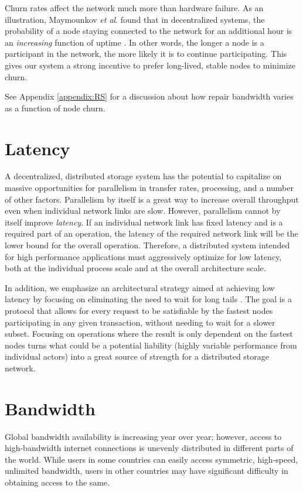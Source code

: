 \documentclass[11pt,fleqn,openany]{book}
\begin{document}
Churn rates affect the network much more than hardware failure. As an
illustration, Maymounkov {\em et al}. found that in
decentralized systems, the probability of a node staying connected to the
network for an additional hour is an {\em increasing}
function of uptime \cite{kad}. In other words, the longer a node is a
participant in the network, the more likely it is to continue
participating. This gives our system a strong incentive to prefer long-lived,
stable nodes to minimize churn.

See Appendix \ref{appendix:RS} for a discussion about how repair bandwidth
varies as a function of node churn.

\section{Latency}

A decentralized, distributed storage system has the potential to capitalize on
massive opportunities for parallelism in transfer rates, processing,
and a number of other factors. Parallelism by
itself is a great way to increase overall throughput even when individual
network links are slow. However, parallelism cannot by itself improve {\em
latency}. If an individual network link has fixed latency and is a required part
of an operation, the latency of the required network link will be the lower
bound for the overall operation.
Therefore, a distributed system
intended for high performance applications must aggressively optimize for low
latency, both at the individual process scale and at the overall architecture
scale.

In addition, we emphasize an architectural strategy aimed at achieving low
latency by focusing on eliminating the need to wait for long tails
\cite{tail-at-scale}.
The goal is a protocol that allows for every request to be satisfiable by the
fastest nodes participating in any given transaction, without needing to wait
for a slower subset.
Focusing on operations where the result is only dependent on the fastest
nodes turns what could be a potential liability (highly variable performance
from individual actors) into a great source of strength for a distributed
storage network.

\section{Bandwidth}

Global bandwidth availability is increasing year over year; however, access to
high-bandwidth internet connections is unevenly distributed in different
parts of the world.
While users in some
countries can easily access symmetric, high-speed, unlimited bandwidth, users in
other countries may have significant difficulty in obtaining access to the same.
\end{document}

